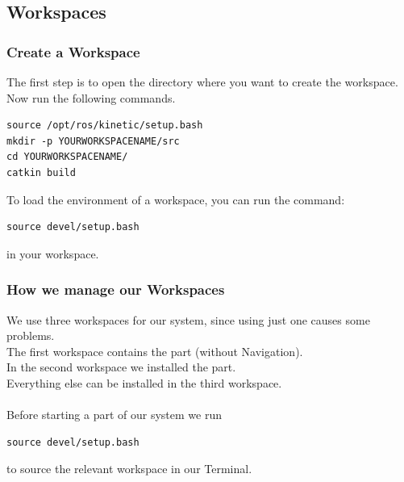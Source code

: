 \documentclass[main.tex]{subfiles}
\begin{document}
	\subsection{Workspaces}
	\subsubsection{Create a Workspace}
	The first step is to open the directory where you want to create the workspace.\\
	Now run the following commands.
	\begin{lstlisting}
source /opt/ros/kinetic/setup.bash
mkdir -p YOURWORKSPACENAME/src
cd YOURWORKSPACENAME/
catkin build 
\end{lstlisting}
	
	To load the environment of a workspace, you can run the command:
	\begin{lstlisting}
source devel/setup.bash
\end{lstlisting}
	in your workspace.
	
	\subsubsection{How we manage our Workspaces}
	
	We use three workspaces for our system, since using just one causes some problems.\\
	The first workspace contains the  part (without Navigation).\\
	In the second workspace we installed the  part.\\
	Everything else can be installed in the third workspace.\\
	\\
	Before starting a part of our system we run 
	\begin{lstlisting}
source devel/setup.bash
\end{lstlisting}
to source the relevant workspace in our Terminal.
	
\end{document}
